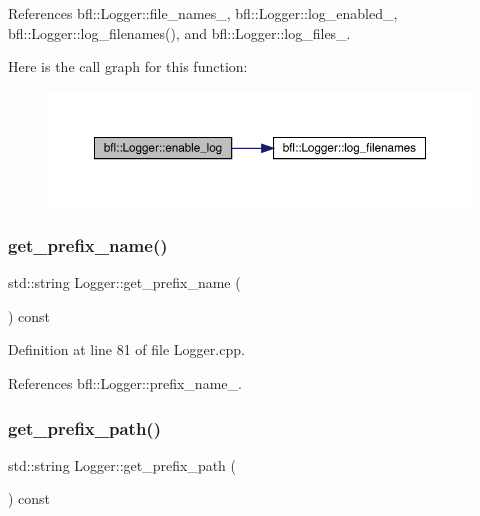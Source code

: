 References bfl\+::\+Logger\+::file\+\_\+names\+\_\+, bfl\+::\+Logger\+::log\+\_\+enabled\+\_\+, bfl\+::\+Logger\+::log\+\_\+filenames(), and bfl\+::\+Logger\+::log\+\_\+files\+\_\+.

Here is the call graph for this function\+:
\nopagebreak
\begin{figure}[H]
\begin{center}
\leavevmode
\includegraphics[width=350pt]{classbfl_1_1Logger_ae94b97b6e8d7902e8ce048384813122e_cgraph}
\end{center}
\end{figure}
\mbox{\label{classbfl_1_1Logger_a913a795b7bfbf378815eeb342d68a7c0}} 
\subsubsection{\texorpdfstring{get\+\_\+prefix\+\_\+name()}{get\_prefix\_name()}}
{\footnotesize\ttfamily std\+::string Logger\+::get\+\_\+prefix\+\_\+name (\begin{DoxyParamCaption}{ }\end{DoxyParamCaption}) const\hspace{0.3cm}{\ttfamily [inherited]}}



Definition at line 81 of file Logger.\+cpp.



References bfl\+::\+Logger\+::prefix\+\_\+name\+\_\+.

\mbox{\label{classbfl_1_1Logger_a56cf1a4e712bf23d9978420a8a59a62b}} 
\subsubsection{\texorpdfstring{get\+\_\+prefix\+\_\+path()}{get\_prefix\_path()}}
{\footnotesize\ttfamily std\+::string Logger\+::get\+\_\+prefix\+\_\+path (\begin{DoxyParamCaption}{ }\end{DoxyParamCaption}) const\hspace{0.3cm}{\ttfamily [inherited]}}



